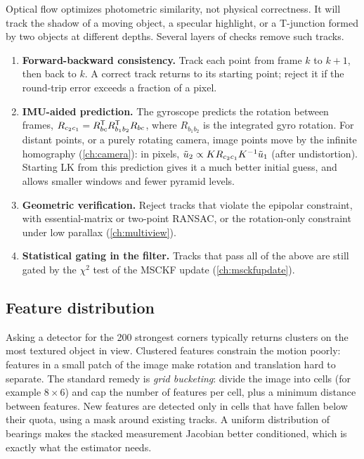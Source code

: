 Optical flow optimizes photometric similarity, not physical correctness. It will track the shadow of a moving object, a specular highlight, or a T-junction formed by
two objects at different depths. Several layers of checks remove such tracks.
\begin{enumerate}
  \item \textbf{Forward-backward consistency.} Track each point from frame $k$ to $k+1$, then back to $k$. A correct track returns to its starting point; reject it if
        the round-trip error exceeds a fraction of a pixel.
  \item \textbf{IMU-aided prediction.} The gyroscope predicts the rotation between frames, $R_{c_2c_1} = R_{bc}^{\mathsf{T}} R_{b_1b_2}^{\mathsf{T}} R_{bc}$, where $R_{b_1b_2}$ is the integrated gyro rotation.
        For distant points, or a purely rotating camera, image points move by the infinite homography (\cref{ch:camera}): in pixels,
        $\tilde u_2 \propto KR_{c_2c_1}K^{-1}\tilde u_1$ (after undistortion). Starting LK from this prediction gives it a much better initial guess, and allows smaller windows and
        fewer pyramid levels.
  \item \textbf{Geometric verification.} Reject tracks that violate the epipolar constraint, with essential-matrix or two-point RANSAC, or the rotation-only constraint under
        low parallax (\cref{ch:multiview}).
  \item \textbf{Statistical gating in the filter.} Tracks that pass all of the above are still gated by the $\chi^2$ test of the MSCKF update (\cref{ch:msckfupdate}).
\end{enumerate}

\subsection{Feature distribution}

Asking a detector for the 200 strongest corners typically returns clusters on the most textured object in view. Clustered features constrain the motion poorly:
features in a small patch of the image make rotation and translation hard to separate. The standard remedy is \emph{grid bucketing}: divide the image into cells
(for example $8\times6$) and cap the number of features per cell, plus a minimum distance between features. New features are detected only in cells that have fallen
below their quota, using a mask around existing tracks. A uniform distribution of bearings makes the stacked measurement Jacobian better conditioned, which is
exactly what the estimator needs.

